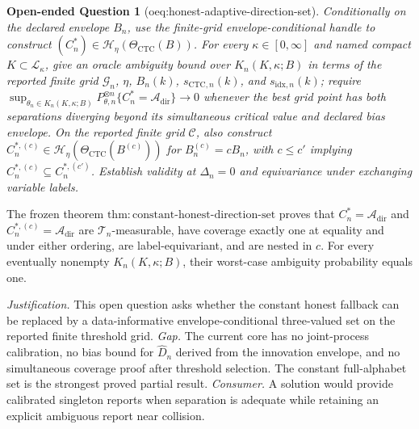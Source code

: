 \documentclass{article}
\newtheorem{openendedquestion}{Open-ended Question}
\begin{document}
\begin{openendedquestion}[oeq:honest-adaptive-direction-set]\label{oeq:honest-adaptive-direction-set}
Conditionally on the declared envelope \(B_n\), use the finite-grid envelope-conditional handle to construct \((C_n^*)\in\mathcal H_\eta(\Theta_{\mathrm{CTC}}(B))\). For every \(\kappa\in[0,\infty]\) and named compact \(K\subset\mathcal L_\kappa\), give an oracle ambiguity bound over \(K_n(K,\kappa;B)\) in terms of the reported finite grid \(\mathcal G_n\), \(\eta\), \(B_n(k)\), \(s_{\mathrm{CTC},n}(k)\), and \(s_{\mathrm{idx},n}(k)\); require \(\sup_{\theta_n\in K_n(K,\kappa;B)}P_{\theta,n}^{\otimes n}\{C_n^*=\mathcal A_{\mathrm{dir}}\}\to0\) whenever the best grid point has both separations diverging beyond its simultaneous critical value and declared bias envelope. On the reported finite grid \(\mathcal C\), also construct \(C_n^{*,(c)}\in\mathcal H_\eta(\Theta_{\mathrm{CTC}}(B^{(c)}))\) for \(B_n^{(c)}=cB_n\), with \(c\leq c'\) implying \(C_n^{*,(c)}\subseteq C_n^{*,(c')}\). Establish validity at \(\Delta_n=0\) and equivariance under exchanging variable labels.
\end{openendedquestion}
The frozen theorem \(\mathrm{thm{:}constant\text{-}honest\text{-}direction\text{-}set}\) proves that \(C_n^*=\mathcal A_{\mathrm{dir}}\) and \(C_n^{*,(c)}=\mathcal A_{\mathrm{dir}}\) are \(\mathcal T_n\)-measurable, have coverage exactly one at equality and under either ordering, are label-equivariant, and are nested in \(c\). For every eventually nonempty \(K_n(K,\kappa;B)\), their worst-case ambiguity probability equals one.
\par\smallskip\noindent \textit{Justification.} This open question asks whether the constant honest fallback can be replaced by a data-informative envelope-conditional three-valued set on the reported finite threshold grid. \textit{Gap.} The current core has no joint-process calibration, no bias bound for \(\widehat D_n\) derived from the innovation envelope, and no simultaneous coverage proof after threshold selection. The constant full-alphabet set is the strongest proved partial result. \textit{Consumer.} A solution would provide calibrated singleton reports when separation is adequate while retaining an explicit ambiguous report near collision.
\end{document}

